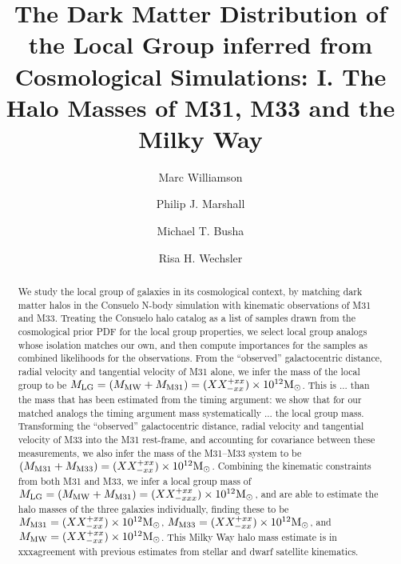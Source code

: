 \documentclass[iop,apj]{emulateapj}
\newcommand{\MMW}{{\rm M}_{\rm MW}}
\newcommand{\Msun}{{\rm M}_\odot}
\newcommand{\consuelo}{{\sc Consuelo }}
\def\MLG{M_{\rm LG}}
\def\MMW{M_{\rm MW}}
\def\MEI{M_{\rm M31}}
\def\MEE{M_{\rm M33}}
\def\MPAIRestimate{XX}
\def\MPAIRerrorplus{xx}
\def\MPAIRerrorminus{xx}
\def\MbAestimate{XX}
\def\MbAerrorplus{xx}
\def\MbAerrorminus{xx}
\def\MTRIPLETestimate{XX}
\def\MTRIPLETerrorplus{xx}
\def\MTRIPLETerrorminus{xxx}
\def\MEIestimate{XX}
\def\MEIerrorplus{xx}
\def\MEIerrorminus{xx}
\def\MEEestimate{XX}
\def\MEEerrorplus{xx}
\def\MEEerrorminus{xx}
\def\MMWestimate{XX}
\def\MMWerrorplus{xx}
\def\MMWerrorminus{xx}
\begin{document}
\title{The Dark Matter Distribution of the Local Group inferred from
Cosmological Simulations: I. The Halo Masses of M31, M33 and the Milky Way}


\author{Marc Williamson}
\author{Philip J. Marshall}
\author{Michael T. Busha} 
\author{Risa H. Wechsler}




\begin{abstract} 

We study the local group of galaxies in its cosmological context, by matching
dark matter halos in the \consuelo N-body simulation with kinematic
observations of M31 and M33. Treating the \consuelo halo  catalog as a list of
samples drawn from the cosmological prior PDF for the local group properties,
we select local group analogs whose isolation matches our own, and then
compute importances for the samples as combined likelihoods for the
observations. 
%
From the ``observed'' galactocentric distance, radial velocity and tangential 
velocity of M31 alone, we infer the mass of the local group to be $\MLG =
(\MMW + \MEI) = (\MPAIRestimate^{+\MPAIRerrorplus}_{-\MPAIRerrorminus}) \times
10^{12} \Msun$. This is ... than the mass that has been estimated from the
timing argument: we show that for our matched analogs the timing argument mass
systematically ... the local group mass. 
%
Transforming the ``observed'' galactocentric distance, radial velocity and
tangential  velocity of M33 into the M31 rest-frame, and accounting for
covariance between these measurements, we also infer the mass of the M31--M33
system to be  $(\MEI + \MEE) =
(\MbAestimate^{+\MbAerrorplus}_{-\MbAerrorminus}) \times 10^{12} \Msun$.
%
Combining the kinematic constraints from both M31 and M33,  we infer a local
group mass of $\MLG = (\MMW + \MEI) =
(\MTRIPLETestimate^{+\MTRIPLETerrorplus}_{-\MTRIPLETerrorminus}) \times
10^{12} \Msun$, and are able to estimate the halo masses of the three galaxies
individually, finding these to be $\MEI =
(\MEIestimate^{+\MEIerrorplus}_{-\MEIerrorminus}) \times 10^{12} \Msun$, $\MEE
= (\MEEestimate^{+\MEEerrorplus}_{-\MEEerrorminus}) \times 10^{12} \Msun$, 
and $\MMW = (\MMWestimate^{+\MMWerrorplus}_{-\MMWerrorminus}) \times 10^{12}
\Msun$. 
%
This Milky Way halo mass estimate is in xxxagreement with previous estimates
from stellar and dwarf satellite kinematics.

\end{abstract}
\end{document}
